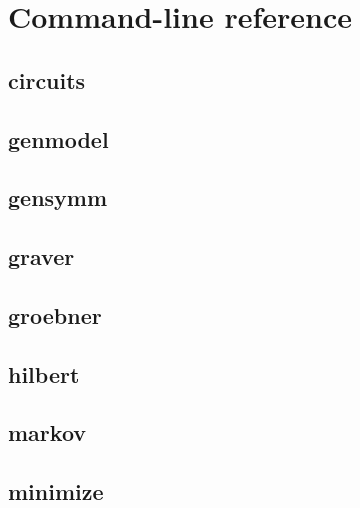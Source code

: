 \chapter{Command-line reference}
\label{Chapter: Reference}

\section{circuits}
\label{s:ref:circuits}
{\small
}

\clearpage
\section{genmodel}
\label{s:ref:genmodel}
{\small
}

\clearpage
\section{gensymm}
\label{s:ref:gensymm}
{\small
}

\clearpage
\section{graver}
\label{s:ref:graver}

{\small
}

\clearpage
\section{groebner}
\label{s:ref:groebner}

{\small
}

\clearpage
\section{hilbert}
\label{s:ref:hilbert}

{\small
}

\clearpage
\section{markov}
\label{s:ref:markov}

{\small
}

\clearpage
\section{minimize}
\label{s:ref:minimize}

